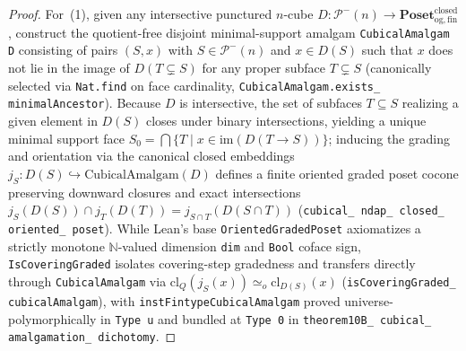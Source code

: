 \begin{proof}
For~(1), given any intersective punctured $n$-cube $D : \mathcal{P}^-(n) \to \mathbf{Poset}_{\mathrm{og,fin}}^{\mathrm{closed}}$, construct the quotient-free disjoint minimal-support amalgam \texttt{CubicalAmalgam D} consisting of pairs $(S, x)$ with $S \in \mathcal{P}^-(n)$ and $x \in D(S)$ such that $x$ does not lie in the image of $D(T \subsetneq S)$ for any proper subface $T \subsetneq S$ (canonically selected via \texttt{Nat.find} on face cardinality, \texttt{CubicalAmalgam.exists\_ minimalAncestor}). Because $D$ is intersective, the set of subfaces $T \subseteq S$ realizing a given element in $D(S)$ closes under binary intersections, yielding a unique minimal support face $S_0 = \bigcap \{T \mid x \in \mathrm{im}(D(T \to S))\}$; inducing the grading and orientation via the canonical closed embeddings $j_S : D(S) \hookrightarrow \mathrm{CubicalAmalgam}(D)$ defines a finite oriented graded poset cocone preserving downward closures and exact intersections $j_S(D(S)) \cap j_T(D(T)) = j_{S \cap T}(D(S \cap T))$ (\texttt{cubical\_ ndap\_ closed\_ oriented\_ poset}). While Lean's base \texttt{OrientedGradedPoset} axiomatizes a strictly monotone $\mathbb{N}$-valued dimension \texttt{dim} and \texttt{Bool} coface sign, \texttt{IsCoveringGraded} isolates covering-step gradedness and transfers directly through \texttt{CubicalAmalgam} via $\mathrm{cl}_Q(j_S(x)) \simeq_o \mathrm{cl}_{D(S)}(x)$ (\texttt{isCoveringGraded\_ cubicalAmalgam}), with \texttt{instFintypeCubicalAmalgam} proved universe-polymorphically in \texttt{Type~u} and bundled at \texttt{Type~0} in \texttt{theorem10B\_ cubical\_ amalgamation\_ dichotomy}.


\end{proof}
